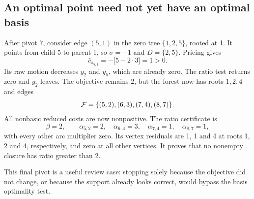 \subsection{An optimal point need not yet have an optimal basis}
After pivot 7, consider edge $(5,1)$ in the zero tree $\{1,2,5\}$,
rooted at 1. It points from child 5 to parent 1, so $\sigma=-1$ and
$D=\{2,5\}$. Pricing gives
\[
 \bar c_{s_{5,1}}=-\bigl[5-2\cdot3\bigr]=1>0.
\]
Its raw motion decreases $y_2$ and $y_5$, which are already zero. The
ratio test returns zero and $y_2$ leaves. The objective remains 2, but
the forest now has roots $1,2,4$ and edges
\[
 \mathcal F=\{(5,2),(6,3),(7,4),(8,7)\}.
\]
All nonbasic reduced costs are now nonpositive. The ratio certificate is
\begin{equation}\label{eq:ratio-example-cert}
 \beta=2,\qquad
 \alpha_{5,2}=2,\quad\alpha_{6,3}=3,\quad
 \alpha_{7,4}=1,\quad\alpha_{8,7}=1,
\end{equation}
with every other arc multiplier zero. Its vertex residuals are 1, 1 and 4
at roots 1, 2 and 4, respectively, and zero at all other vertices.
It proves that no nonempty closure has ratio greater than 2.

This final pivot is a useful review case: stopping solely because the
objective did not change, or because the support already looks correct,
would bypass the basis optimality test.
